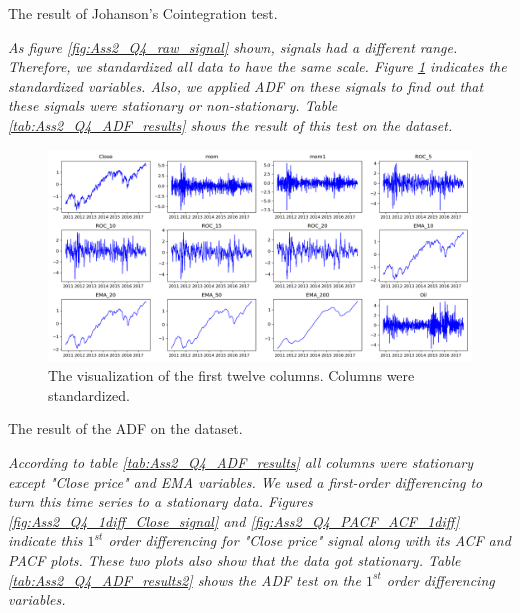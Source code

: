 \begin{table}[H]
\centering
\caption{The result of Johanson's Cointegration test.}
\label{tab:Ass2_Q4_coin}

\end{table}


\textit{As figure \ref{fig:Ass2_Q4_raw_signal} shown, signals had a different range. Therefore, we standardized all data to have the same scale. Figure \ref{fig:Ass2_Q4_standard_data} indicates the standardized variables. Also, we applied \gls{ADF} on these signals to find out that these signals were stationary or non-stationary. Table \ref{tab:Ass2_Q4_ADF_results} shows the result of this test on the dataset.}

\begin{figure}[H]
    \centering
    \begin{minipage}[b]{1\textwidth}
        \includegraphics[width=\textwidth]{figures/Ass2/Ass2_Q4_standard_data.png}
    \end{minipage}
    \caption{The visualization of the first twelve columns. Columns were standardized.}
    \label{fig:Ass2_Q4_standard_data}
\end{figure}


\begin{table}[H]
\centering
\caption{The result of the \gls{ADF} on the dataset.}
\label{tab:Ass2_Q4_ADF_results}

\end{table}

\textit{According to table \ref{tab:Ass2_Q4_ADF_results} all columns were stationary except "Close price" and EMA variables.  
We used a first-order differencing to turn this time series to a stationary data. Figures \ref{fig:Ass2_Q4_1diff_Close_signal} and \ref{fig:Ass2_Q4_PACF_ACF_1diff} indicate this $1^{st}$ order differencing for "Close price" signal along with its \gls{ACF} and \gls{PACF} plots. These two plots also show that the data got stationary. Table \ref{tab:Ass2_Q4_ADF_results2} shows the ADF test on the $1^{st}$ order differencing variables.}

